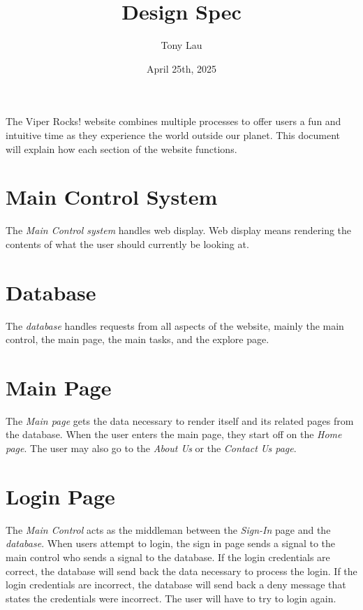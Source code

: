 \documentclass{article}
\begin{document}
\title{Design Spec}
\author{Tony Lau}
\date{April 25th, 2025}

\maketitle

\fancyhf{}
\fancyfoot[C]{\thepage}

The Viper Rocks! website combines multiple processes to offer users a fun and intuitive time as they experience the world outside our planet. This document will explain how each section of the website functions.

\section{Main Control System}
The \textit{Main Control system} handles web display. Web display means rendering the contents of what the
user should currently be looking at.

\section{Database}
The \textit{database} handles requests from all aspects of the website, mainly the main control, the main page, the main tasks, and the explore page.

\section{Main Page}
The \textit{Main page} gets the data necessary to render itself and its related pages from the database. When the user enters the main page, they start off on the \textit{Home page}. The user may also go to the \textit{About Us} or the \textit{Contact Us page}.

\section{Login Page}
The \textit{Main Control} acts as the middleman between the \textit{Sign-In} page and the \textit{database}. When users attempt to login, the sign in page sends a signal to the main control who sends a signal to the database. If the login credentials are correct, the database will send back the data necessary to process the login. If the login credentials are incorrect, the database will send back a deny message that states the credentials were incorrect. The user will have to try to login again.
\end{document}
